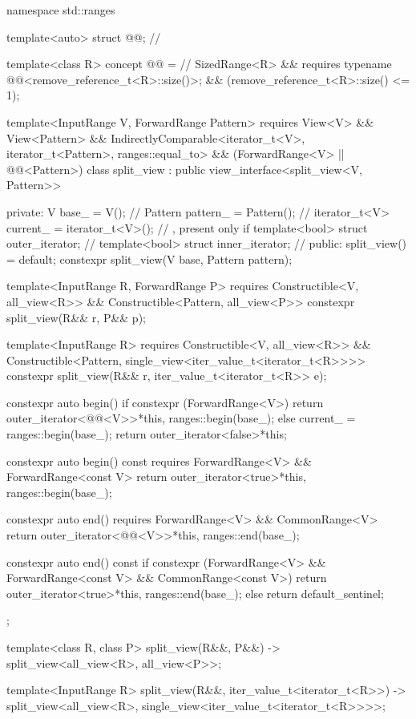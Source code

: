 \begin{codeblock}
namespace std::ranges {
  template<auto> struct @@;       // \expos

  template<class R>
  concept @@ =                          // \expos
    SizedRange<R> &&
    requires { typename @@<remove_reference_t<R>::size()>; } &&
    (remove_reference_t<R>::size() <= 1);

  template<InputRange V, ForwardRange Pattern>
    requires View<V> && View<Pattern> &&
             IndirectlyComparable<iterator_t<V>, iterator_t<Pattern>, ranges::equal_to> &&
             (ForwardRange<V> || @@<Pattern>)
  class split_view : public view_interface<split_view<V, Pattern>> {
  private:
    V base_ = V();                              // \expos
    Pattern pattern_ = Pattern();               // \expos
    iterator_t<V> current_ = iterator_t<V>();   // \expos, present only if 
    template<bool> struct outer_iterator;       // \expos
    template<bool> struct inner_iterator;       // \expos
  public:
    split_view() = default;
    constexpr split_view(V base, Pattern pattern);

    template<InputRange R, ForwardRange P>
      requires Constructible<V, all_view<R>> &&
               Constructible<Pattern, all_view<P>>
    constexpr split_view(R&& r, P&& p);

    template<InputRange R>
      requires Constructible<V, all_view<R>> &&
               Constructible<Pattern, single_view<iter_value_t<iterator_t<R>>>>
    constexpr split_view(R&& r, iter_value_t<iterator_t<R>> e);

    constexpr auto begin() {
      if constexpr (ForwardRange<V>)
        return outer_iterator<@@<V>>{*this, ranges::begin(base_)};
      else {
        current_ = ranges::begin(base_);
        return outer_iterator<false>{*this};
      }
    }

    constexpr auto begin() const requires ForwardRange<V> && ForwardRange<const V> {
      return outer_iterator<true>{*this, ranges::begin(base_)};
    }

    constexpr auto end() requires ForwardRange<V> && CommonRange<V> {
      return outer_iterator<@@<V>>{*this, ranges::end(base_)};
    }

    constexpr auto end() const {
      if constexpr (ForwardRange<V> && ForwardRange<const V> && CommonRange<const V>)
        return outer_iterator<true>{*this, ranges::end(base_)};
      else
        return default_sentinel;
    }
  };

  template<class R, class P>
    split_view(R&&, P&&) -> split_view<all_view<R>, all_view<P>>;

  template<InputRange R>
    split_view(R&&, iter_value_t<iterator_t<R>>)
      -> split_view<all_view<R>, single_view<iter_value_t<iterator_t<R>>>>;
}
\end{codeblock}


